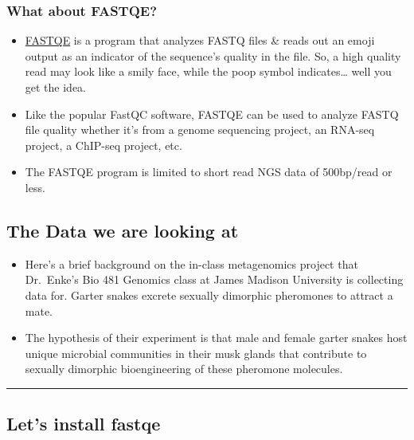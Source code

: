 \documentclass[
]{article}
\begin{document}
\hypertarget{what-about-fastqe}{%
\subsubsection{What about FASTQE?}\label{what-about-fastqe}}

\begin{itemize}
\item
  \href{https://fastqe.com/}{FASTQE} is a program that analyzes FASTQ
  files \& reads out an emoji output as an indicator of the sequence's
  quality in the file. So, a high quality read may look like a smily
  face, while the poop symbol indicates\ldots{} well you get the idea.
\item
  Like the popular FastQC software, FASTQE can be used to analyze FASTQ
  file quality whether it's from a genome sequencing project, an RNA-seq
  project, a ChIP-seq project, etc.
\item
  The FASTQE program is limited to short read NGS data of 500bp/read or
  less.
\end{itemize}

\hypertarget{the-data-we-are-looking-at}{%
\subsection{The Data we are looking
at}\label{the-data-we-are-looking-at}}

\begin{itemize}
\item
  Here's a brief background on the in-class metagenomics project that
  Dr.~Enke's Bio 481 Genomics class at James Madison University is
  collecting data for. Garter snakes excrete sexually dimorphic
  pheromones to attract a mate.
\item
  The hypothesis of their experiment is that male and female garter
  snakes host unique microbial communities in their musk glands that
  contribute to sexually dimorphic bioengineering of these pheromone
  molecules.
\end{itemize}

\begin{center}\rule{0.5\linewidth}{0.5pt}\end{center}

\hypertarget{lets-install-fastqe}{%
\subsection{Let's install fastqe}\label{lets-install-fastqe}}
\end{document}
